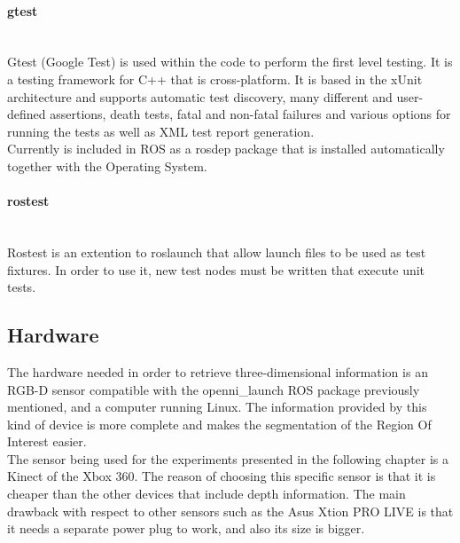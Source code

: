		\paragraph{gtest}\mbox{} \\

		\label{gtest}
		Gtest (Google Test) is used within the code to perform the first level testing. It is a testing framework for C++ that is cross-platform. It is based in the xUnit architecture and supports automatic test discovery, many different and user-defined assertions, death tests, fatal and non-fatal failures and various options for running the tests as well as XML test report generation. 
		\\

		Currently is included in ROS as a rosdep package that is installed automatically together with the Operating System. 


		\paragraph{rostest}\mbox{} \\

		\label{rostest}
		Rostest is an extention to roslaunch that allow launch files to be used as test fixtures. 
		In order to use it, new test nodes must be written that execute unit tests. 


	\subsection{Hardware}
		\label{technologies_hardware}

		The hardware needed in order to retrieve three-dimensional information is an RGB-D sensor compatible with the openni\_launch ROS package previously mentioned, and a computer running Linux. The information provided by this kind of device is more complete and makes the segmentation of the Region Of Interest easier. \\

		The sensor being used for the experiments presented in the following chapter is a Kinect of the Xbox 360. The reason of choosing this specific sensor is that it is cheaper than the other devices that include depth information. The main drawback with respect to other sensors such as the Asus Xtion PRO LIVE\cite{xtion} is that it needs a separate power plug to work, and also its size is bigger. 
		\\



